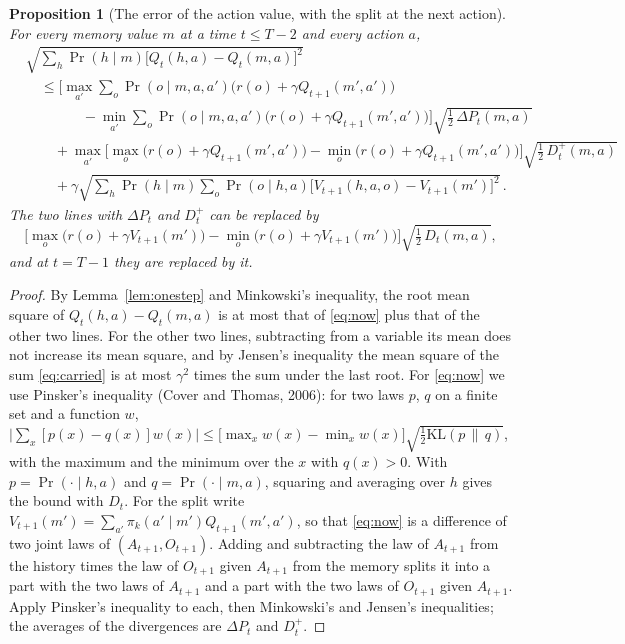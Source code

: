 \documentclass[11pt]{article}
\newtheorem{proposition}{Proposition}
\theoremstyle{definition}
\newcommand{\KL}{\mathrm{KL}}
\newcommand{\dP}{\Delta P}
\begin{document}
\begin{proposition}[The error of the action value, with the split at the next action]\label{prop:q}
For every memory value $m$ at a time $t\le T-2$ and every action $a$,
\begin{align*}
&\sqrt{\sum_h\Pr(h\mid m)\big[Q_t(h,a)-Q_t(m,a)\big]^2}\\
&\quad\le\Big[\max_{a'}\sum_o\Pr(o\mid m,a,a')\big(r(o)+\gamma Q_{t+1}(m',a')\big)\\
&\qquad\qquad-\min_{a'}\sum_o\Pr(o\mid m,a,a')\big(r(o)+\gamma Q_{t+1}(m',a')\big)\Big]\sqrt{\tfrac12\,\dP_t(m,a)}\\
&\qquad+\max_{a'}\Big[\max_o\big(r(o)+\gamma Q_{t+1}(m',a')\big)-\min_o\big(r(o)+\gamma Q_{t+1}(m',a')\big)\Big]\sqrt{\tfrac12\,D^+_t(m,a)}\\
&\qquad+\gamma\sqrt{\sum_h\Pr(h\mid m)\sum_o\Pr(o\mid h,a)\big[V_{t+1}(h,a,o)-V_{t+1}(m')\big]^2}\,.
\end{align*}
The two lines with $\dP_t$ and $D^+_t$ can be replaced by
\[
\Big[\max_o\big(r(o)+\gamma V_{t+1}(m')\big)-\min_o\big(r(o)+\gamma V_{t+1}(m')\big)\Big]\sqrt{\tfrac12\,D_t(m,a)},
\]
and at $t=T-1$ they are replaced by it.
\end{proposition}
\begin{proof}
By Lemma~\ref{lem:onestep} and Minkowski's inequality, the root mean square of $Q_t(h,a)-Q_t(m,a)$ is at most that of \eqref{eq:now} plus that of the other two lines. For the other two lines, subtracting from a variable its mean does not increase its mean square, and by Jensen's inequality the mean square of the sum \eqref{eq:carried} is at most $\gamma^2$ times the sum under the last root. For \eqref{eq:now} we use Pinsker's inequality (Cover and Thomas, 2006): for two laws $p$, $q$ on a finite set and a function $w$, $\big|\sum_x[p(x)-q(x)]w(x)\big|\le\big[\max_xw(x)-\min_xw(x)\big]\sqrt{\tfrac12\KL(p\,\|\,q)}$, with the maximum and the minimum over the $x$ with $q(x)>0$. With $p=\Pr(\cdot\mid h,a)$ and $q=\Pr(\cdot\mid m,a)$, squaring and averaging over $h$ gives the bound with $D_t$. For the split write $V_{t+1}(m')=\sum_{a'}\pi_k(a'\mid m')Q_{t+1}(m',a')$, so that \eqref{eq:now} is a difference of two joint laws of $(A_{t+1},O_{t+1})$. Adding and subtracting the law of $A_{t+1}$ from the history times the law of $O_{t+1}$ given $A_{t+1}$ from the memory splits it into a part with the two laws of $A_{t+1}$ and a part with the two laws of $O_{t+1}$ given $A_{t+1}$. Apply Pinsker's inequality to each, then Minkowski's and Jensen's inequalities; the averages of the divergences are $\dP_t$ and $D^+_t$.
\end{proof}
\end{document}
